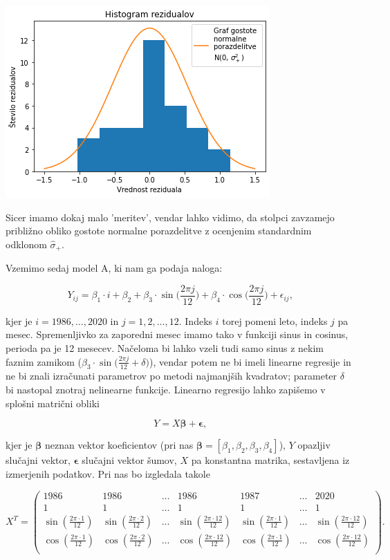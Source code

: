 \documentclass[12pt, a4paper]{article}
\begin{document}
\begin{center}
    \includegraphics[scale=0.7]{Naloga_3_04}
\end{center}

Sicer imamo dokaj malo 'meritev', vendar lahko vidimo, da stolpci zavzamejo približno 
obliko gostote normalne porazdelitve z ocenjenim standardnim odklonom $\hat{\sigma}_+$.

Vzemimo sedaj model A, ki nam ga podaja naloga:

\[
    Y_{ij} = \beta_1 \cdot i + \beta_2 + \beta_3 \cdot \sin \Big(\frac{2\pi j}{12}\Big) 
    + \beta_4 \cdot \cos \Big(\frac{2\pi j}{12}\Big) + \epsilon_{ij} \text{,}
\]

kjer je $i=1986,\dots,2020$ in $j=1,2,\dots,12$. Indeks $i$ torej pomeni leto, indeks 
$j$ pa mesec. Spremenljivko za zaporedni mesec imamo tako v funkciji sinus in cosinus, 
perioda pa je 12 mesecev. 
Načeloma bi lahko vzeli tudi samo sinus z nekim faznim zamikom ($\beta_3 \cdot\sin 
\big(\frac{2\pi j}{12} + \delta \big)$), vendar potem 
ne bi imeli linearne regresije in ne bi znali izračunati parametrov po metodi najmanjših 
kvadratov; parameter $\delta$ bi nastopal znotraj nelinearne funkcije.
Linearno regresijo lahko zapišemo v splošni matrični obliki

$$ Y = X\boldsymbol{\beta} + \boldsymbol{\epsilon} \text{,}
$$

kjer je $\boldsymbol{\beta}$ neznan vektor koeficientov (pri nas $\boldsymbol{\beta} = 
[\beta_1, \beta_2, \beta_3, \beta_4]$), $Y$ opazljiv slučajni vektor, 
$\boldsymbol{\epsilon}$ slučajni vektor šumov, $X$ pa konstantna matrika, sestavljena 
iz izmerjenih podatkov. Pri nas bo izgledala takole

$$
X^T =
\left( \begin{array}{ccccccc}
    1986& 1986  & \ldots    & 1986  & 1987  & \ldots    & 2020  \\
    1   & 1     & \ldots    & 1     & 1     & \ldots    & 1     \\
    \sin(\frac{2\pi\cdot1}{12}) & \sin(\frac{2\pi\cdot2}{12}) & \ldots &
    \sin(\frac{2\pi\cdot12}{12}) & \sin(\frac{2\pi\cdot1}{12}) &
    \ldots  & \sin(\frac{2\pi\cdot12}{12})   \\
    \cos(\frac{2\pi\cdot1}{12}) & \cos(\frac{2\pi\cdot2}{12}) & \ldots &
    \cos(\frac{2\pi\cdot12}{12}) & \cos(\frac{2\pi\cdot1}{12}) &
    \ldots  & \cos(\frac{2\pi\cdot12}{12})   \\
    \end{array} \right)
    \text{.}
$$
\end{document}
